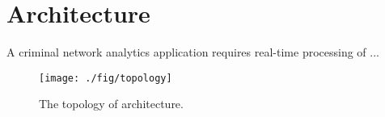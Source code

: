 \section{Architecture}
\label{sec:architecture}

A criminal network analytics application requires real-time processing of ...

\lipsum[1]

\begin{figure*}
\centering
\texttt{[image: ./fig/topology]}
\caption{The topology of architecture.}
\label{fig:topology}
\end{figure*}

\lipsum[1]

